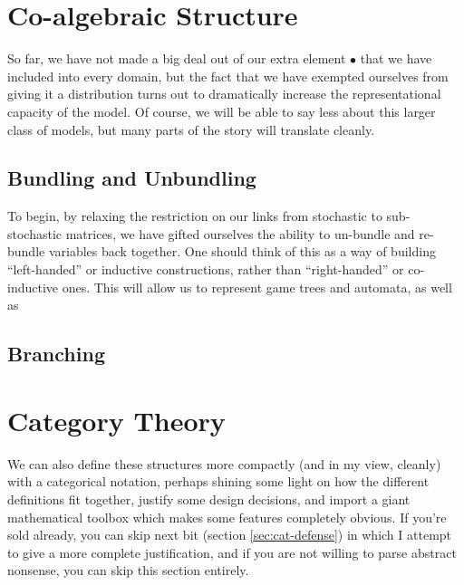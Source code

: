 \documentclass{article}
\begin{document}
\begin{vcat}  %

	\section{Co-algebraic Structure}
	So far, we have not made a big deal out of our extra element $\bullet$ that we have included into every domain, but the fact that we have exempted ourselves from giving it a distribution turns out to dramatically increase the representational capacity of the model. Of course, we will be able to say less about this larger class of models, but many parts of the story will translate cleanly.

	\subsection{Bundling and Unbundling} 
	To begin, by relaxing the restriction on our links from stochastic to sub-stochastic matrices, we have gifted ourselves the ability to un-bundle and re-bundle variables back together. One should think of this as a way of building ``left-handed'' or inductive constructions, rather than ``right-handed'' or co-inductive ones. This will allow us to represent game trees and automata, as well as
	
	\begin{center}
		\begin{tikzpicture}
		
		\end{tikzpicture}
	\end{center}
	
	\subsection{Branching}
	
	\section{Category Theory}

	We can also define these structures more compactly (and in my view, cleanly) with a categorical notation, perhaps shining some light on how the different definitions fit together, justify some design decisions, and import a giant mathematical toolbox which makes some features completely obvious. If you're sold already, you can skip next bit (section \ref{sec:cat-defense}) in which I attempt to give a more complete justification, and if you are not willing to parse abstract nonsense, you can skip this section entirely.
	

\end{vcat}
\end{document}
